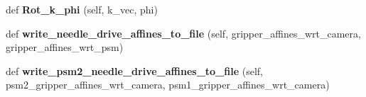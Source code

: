 \begin{DoxyCompactItemize}
\item 
def {\bfseries Rot\+\_\+k\+\_\+phi} (self, k\+\_\+vec, phi)\hypertarget{classneedle__planner__gripper__working_1_1needle__planner_a77ff6227a6a2b3cbe6ffda3d305d0b76}{}\label{classneedle__planner__gripper__working_1_1needle__planner_a77ff6227a6a2b3cbe6ffda3d305d0b76}

\item 
def {\bfseries write\+\_\+needle\+\_\+drive\+\_\+affines\+\_\+to\+\_\+file} (self, gripper\+\_\+affines\+\_\+wrt\+\_\+camera, gripper\+\_\+affines\+\_\+wrt\+\_\+psm)\hypertarget{classneedle__planner__gripper__working_1_1needle__planner_aa209c374a2acf1b68d7e68603f607b39}{}\label{classneedle__planner__gripper__working_1_1needle__planner_aa209c374a2acf1b68d7e68603f607b39}

\item 
def {\bfseries write\+\_\+psm2\+\_\+needle\+\_\+drive\+\_\+affines\+\_\+to\+\_\+file} (self, psm2\+\_\+gripper\+\_\+affines\+\_\+wrt\+\_\+camera, psm1\+\_\+gripper\+\_\+affines\+\_\+wrt\+\_\+camera)\hypertarget{classneedle__planner__gripper__working_1_1needle__planner_aed6e156b5020af7094787c7b1cfee47f}{}\label{classneedle__planner__gripper__working_1_1needle__planner_aed6e156b5020af7094787c7b1cfee47f}

\end{DoxyCompactItemize}

